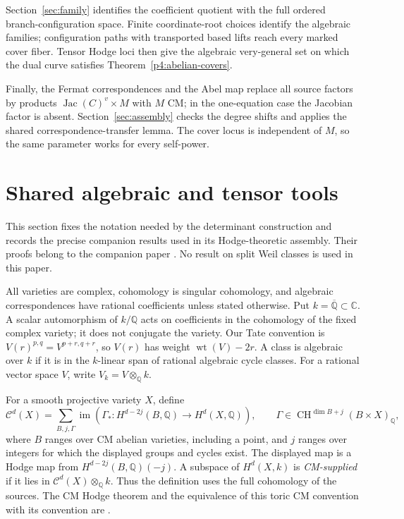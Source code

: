 \documentclass[11pt]{article}
\newcommand{\Q}{\mathbb Q}
\newcommand{\C}{\mathbb C}
\newcommand{\Qbar}{\overline{\mathbb Q}}
\newcommand{\CH}{\operatorname{CH}}
\newcommand{\Jac}{\operatorname{Jac}}
\theoremstyle{plain}
\theoremstyle{definition}
\theoremstyle{remark}
\numberwithin{equation}{section}
\begin{document}
Section~\ref{sec:family} identifies the coefficient quotient with the
full ordered branch-configuration space.  Finite coordinate-root
choices identify the algebraic families; configuration paths with
transported based lifts reach every marked cover fiber.  Tensor
Hodge loci then give the algebraic very-general set on which the
dual curve satisfies Theorem~\ref{p4:abelian-covers}.

Finally, the Fermat correspondences and the Abel map replace all source
factors by products \(\Jac(C)^v\times M\) with \(M\) CM; in the
one-equation case the Jacobian factor is absent.  Section~\ref{sec:assembly}
checks the degree shifts and applies the shared correspondence-transfer
lemma.  The cover locus is independent of \(M\), so the same parameter
works for every self-power.

\section{Shared algebraic and tensor tools}
\label{sec:shared}

This section fixes the notation needed by the determinant construction
and records the precise companion results used in its Hodge-theoretic
assembly.  Their proofs belong to the companion paper
\cite[Section~2]{OpenAIAbelianPowers}.
No result on split Weil classes is used in this paper.

All varieties are complex, cohomology is singular cohomology, and
algebraic correspondences have rational coefficients unless stated
otherwise.  Put \(k=\Qbar\subset\C\).  A scalar automorphism of \(k/\Q\)
acts on coefficients in the cohomology of the fixed complex variety;
it does not conjugate the variety.  Our Tate convention is
\(V(r)^{p,q}=V^{p+r,q+r}\), so \(V(r)\) has weight
\(\operatorname{wt}(V)-2r\).  A class is algebraic over \(k\) if it is
in the \(k\)-linear span of rational algebraic cycle classes.
For a rational vector space \(V\), write \(V_k=V\otimes_\Q k\).

For a smooth projective variety \(X\), define
\[
 \mathcal C^d(X)=
 \sum_{B,j,\Gamma}\operatorname{im}\!\left(
 \Gamma_*:H^{d-2j}(B,\Q)\longrightarrow H^d(X,\Q)\right),
 \qquad
 \Gamma\in\CH^{\dim B+j}(B\times X)_\Q ,
\]
where \(B\) ranges over CM abelian varieties, including a point, and
\(j\) ranges over integers for which the displayed groups and cycles exist.
The displayed map is a Hodge map from \(H^{d-2j}(B,\Q)(-j)\).
A subspace of \(H^d(X,k)\) is \emph{CM-supplied} if it lies in
\(\mathcal C^d(X)\otimes_\Q k\).  Thus the definition uses the full
cohomology of the sources.  The CM Hodge theorem and the equivalence of
this toric CM convention with its convention are
\cite[Theorem~1.1 and Lemma~2.3]{OpenAICM}.
\end{document}
